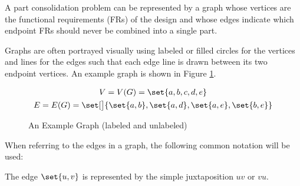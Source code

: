A part consolidation problem can be represented by a graph whose vertices are the functional requirements (FRs) of
the design and whose edges indicate which endpoint FRs should never be combined into a single part.

Graphs are often portrayed visually using labeled or filled circles for the vertices and lines for the edges such
that each edge line is drawn between its two endpoint vertices.  An example graph is shown in Figure
\ref{fig:exgraph}.

\begin{figure}[h]
  \label{fig:exgraph}
  \begin{minipage}{3in}
    \vspace{0in}
    \begin{center}
    \end{center}
  \end{minipage}
  \begin{minipage}{3in}
    \vspace{0in}
    \begin{center}
    \end{center}
  \end{minipage}
  \begin{gather*}
    V=V(G)=\set{a,b,c,d,e} \\
    E=E(G)=\set[\big]{\set{a,b},\set{a,d},\set{a,e},\set{b,e}}
  \end{gather*}
  \caption{An Example Graph (labeled and unlabeled)}
\end{figure}

\begin{samepage}
  When referring to the edges in a graph, the following common notation will be used:

  \begin{notation}[Edge]
    The edge \(\set{u,v}\) is represented by the simple juxtaposition \(uv\) or \(vu\).
  \end{notation}
\end{samepage}

